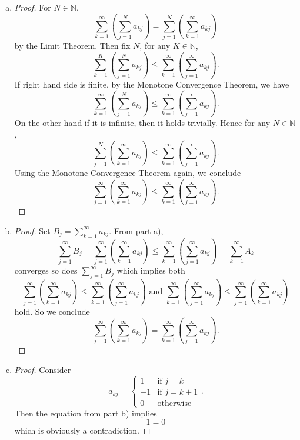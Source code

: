 \begin{Exercise}
\begin{enumerate}[a)]
\item 
\begin{proof}
For $N\in\mathbb{N}$, $$ \sum_{k=1}^{\infty}\left( \sum_{j=1}^{N}a_{kj} \right) = \sum_{j=1}^{N}\left( \sum_{k=1}^{\infty}a_{kj} \right) $$ by the Limit Theorem. Then fix $N$, for any $K\in\mathbb{N}$, $$ \sum_{k=1}^{K}\left( \sum_{j=1}^{N}a_{kj} \right) \leq \sum_{k=1}^{\infty}\left( \sum_{j=1}^{\infty}a_{kj} \right).$$
If right hand side is finite, by the Monotone Convergence Theorem, we have $$\sum_{k=1}^{\infty}\left( \sum_{j=1}^{N}a_{kj} \right) \leq \sum_{k=1}^{\infty}\left( \sum_{j=1}^{\infty}a_{kj} \right).$$
On the other hand if it is infinite, then it holds trivially. Hence for any $N\in\mathbb{N}$, $$\sum_{j=1}^{N}\left( \sum_{k=1}^{\infty}a_{kj} \right) \leq \sum_{k=1}^{\infty}\left( \sum_{j=1}^{\infty}a_{kj} \right).$$ Using the Monotone Convergence Theorem again, we conclude $$\sum_{j=1}^{\infty}\left( \sum_{k=1}^{\infty}a_{kj} \right) \leq \sum_{k=1}^{\infty}\left( \sum_{j=1}^{\infty}a_{kj} \right).$$
\end{proof}

\item
\begin{proof}
Set $B_j = \sum_{k=1}^{\infty}a_{kj}$. From part a), $$ \sum_{j=1}^{\infty}B_j = \sum_{j=1}^{\infty}\left( \sum_{k=1}^{\infty}a_{kj} \right) \leq \sum_{k=1}^{\infty}\left( \sum_{j=1}^{\infty}a_{kj} \right) = \sum_{k=1}^{\infty}A_k$$ converges so does $\sum_{j=1}^{\infty}B_j$ which implies both $$\sum_{j=1}^{\infty}\left( \sum_{k=1}^{\infty}a_{kj} \right) \leq \sum_{k=1}^{\infty}\left( \sum_{j=1}^{\infty}a_{kj} \right) \mbox{ and } \sum_{k=1}^{\infty}\left( \sum_{j=1}^{\infty}a_{kj} \right) \leq \sum_{j=1}^{\infty}\left( \sum_{k=1}^{\infty}a_{kj} \right) $$ hold. So we conclude $$\sum_{j=1}^{\infty}\left( \sum_{k=1}^{\infty}a_{kj} \right) = \sum_{k=1}^{\infty}\left( \sum_{j=1}^{\infty}a_{kj} \right).$$
\end{proof}

\item
\begin{proof}
Consider $$a_{kj} = \begin{cases}1 & \mbox{if } j=k \\
-1 & \mbox{if }j=k+1 \\
0 & \mbox{otherwise} \end{cases}.$$
Then the equation from part b) implies $$ 1 = 0 $$ which is obviously a contradiction.
\end{proof}
\end{enumerate}
\end{Exercise}